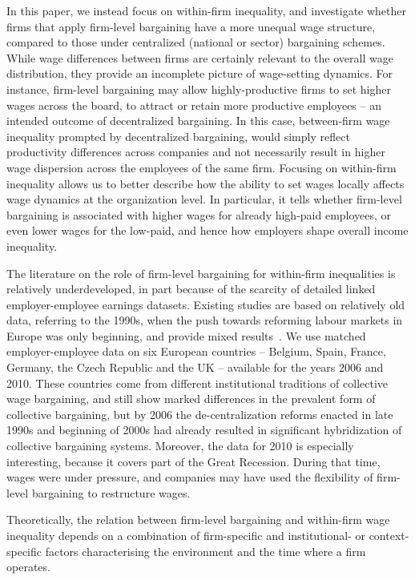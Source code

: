 \documentclass[12pt]{article}
\begin{document}
In this paper, we instead focus on within-firm inequality, and investigate whether firms that apply firm-level bargaining have a more unequal wage structure, compared to those under centralized (national or sector) bargaining schemes. While wage differences between firms are certainly relevant to the overall wage distribution, they provide an incomplete picture of wage-setting dynamics. For instance, firm-level bargaining may allow highly-productive firms to set higher wages across the board, to attract or retain more productive employees -- an intended outcome of decentralized bargaining. In this case, between-firm wage inequality prompted by decentralized bargaining, would simply reflect productivity differences across companies and not necessarily result in higher wage dispersion across the employees of the same firm. Focusing on within-firm inequality allows us to better describe how the ability to set wages locally affects wage dynamics at the organization level. In particular, it tells whether firm-level bargaining is associated with higher wages for already high-paid employees, or even lower wages for the low-paid, and hence how employers shape overall income inequality. 

The literature on the role of firm-level bargaining for within-firm inequalities is relatively underdeveloped, in part because of the scarcity of detailed linked employer-employee earnings datasets. Existing studies are based on relatively old data, referring to the 1990s, when the push towards reforming labour markets in Europe was only beginning, and provide mixed results~\citep{dellaringa.lucifora.1994,dellaringa.lucifora.ea.2004, canaldominguez.gutierrez.2004}.
We use matched employer-employee data on six European countries -- Belgium, Spain, France, Germany, the Czech Republic and the UK -- available for the years 2006 and 2010. These countries come from different institutional traditions of collective wage bargaining, and still show marked differences in the prevalent form of collective bargaining, but by 2006 the de-centralization reforms enacted in late 1990s and beginning of 2000s had already resulted in significant hybridization of collective bargaining systems. Moreover, the data for 2010 is especially interesting, because it covers part of the Great Recession. During that time, wages were under pressure, and companies may have used the flexibility of firm-level bargaining to restructure wages.

Theoretically, the relation between firm-level bargaining and within-firm wage inequality depends on a combination of firm-specific and institutional- or context-specific factors characterising the environment and the time where a firm operates. 
\end{document}
